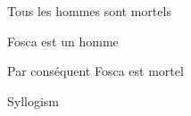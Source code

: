%	
%	

\epigraph{
	Tous les hommes sont mortels
	
	Fosca est un homme
	
	Par conséquent Fosca est mortel
}{
	Syllogism
}